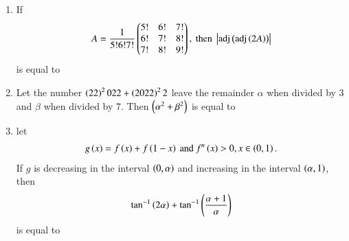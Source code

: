 \documentclass[journal]{IEEEtran}
\numberwithin{equation}{enumi}
\numberwithin{figure}{enumi}
\begin{document}
\begin{enumerate}
    \hfill{}

    \begin{enumerate}
    \end{enumerate}

    \item 
    If 
    \begin{align*}
        A = \frac{1}{5!6!7!}\begin{pmatrix}5! & 6! & 7!\\6! & 7! & 8!\\7! & 8! & 9!\end{pmatrix}, \text{ then } \left\vert\text{adj}\left(\text{adj}\left(2A\right)\right)\right\vert
    \end{align*}
    is equal to

    \hfill{}

    \begin{enumerate}
    \end{enumerate}

    \item 
    Let the number $\left(22\right)^2022 + \left(2022\right)^22$ leave the remainder $\alpha$ when divided by $3$ and $\beta$ when divided by $7$. Then $\left(\alpha^2 + \beta^2\right)$ is equal to

    \hfill{}

    \begin{enumerate}
    \end{enumerate}

    \item 
    let 
    \begin{align*}
        g\left(x\right) = f\left(x\right) + f\left(1 - x\right) \text{ and } f^n\left(x\right) > 0, x \in \left(0, 1\right).
    \end{align*}
    If $g$ is decreasing in the interval $\left(0, \alpha\right)$ and increasing in the interval $\left(\alpha, 1\right)$, then 
    \begin{align*}
        \tan^{-1} {\left(2\alpha\right)} + \tan^{-1} {\left(\frac{\alpha + 1}{\alpha}\right)}
    \end{align*}
    is equal to


\end{enumerate}
\end{document}
